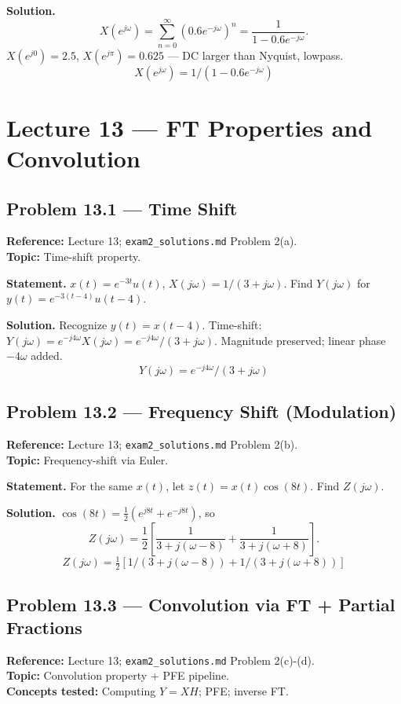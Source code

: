\documentclass[11pt]{article}
\begin{document}
\textbf{Solution.}
\[
X(e^{j\omega}) = \sum_{n=0}^\infty (0.6 e^{-j\omega})^n = \frac{1}{1 - 0.6 e^{-j\omega}}.
\]
$X(e^{j0}) = 2.5$, $X(e^{j\pi}) = 0.625$ --- DC larger than Nyquist, lowpass.
\[
\boxed{\,X(e^{j\omega}) = 1/(1-0.6 e^{-j\omega})\,}
\]

\section{Lecture 13 --- FT Properties and Convolution}

\subsection{Problem 13.1 --- Time Shift}
\textbf{Reference:} Lecture 13; \texttt{exam2\_solutions.md} Problem 2(a).\\
\textbf{Topic:} Time-shift property.

\textbf{Statement.} $x(t) = e^{-3t}u(t)$, $X(j\omega) = 1/(3+j\omega)$. Find $Y(j\omega)$ for $y(t) = e^{-3(t-4)}u(t-4)$.

\textbf{Solution.}
Recognize $y(t) = x(t-4)$. Time-shift: $Y(j\omega) = e^{-j4\omega}X(j\omega) = e^{-j4\omega}/(3+j\omega)$. Magnitude preserved; linear phase $-4\omega$ added.
\[
\boxed{\,Y(j\omega) = e^{-j4\omega}/(3+j\omega)\,}
\]

\subsection{Problem 13.2 --- Frequency Shift (Modulation)}
\textbf{Reference:} Lecture 13; \texttt{exam2\_solutions.md} Problem 2(b).\\
\textbf{Topic:} Frequency-shift via Euler.

\textbf{Statement.} For the same $x(t)$, let $z(t) = x(t)\cos(8t)$. Find $Z(j\omega)$.

\textbf{Solution.}
$\cos(8t) = \tfrac{1}{2}(e^{j8t}+e^{-j8t})$, so
\[
Z(j\omega) = \frac{1}{2}\left[\frac{1}{3+j(\omega-8)} + \frac{1}{3+j(\omega+8)}\right].
\]
\[
\boxed{\,Z(j\omega) = \tfrac{1}{2}[1/(3+j(\omega-8)) + 1/(3+j(\omega+8))]\,}
\]

\subsection{Problem 13.3 --- Convolution via FT + Partial Fractions}
\textbf{Reference:} Lecture 13; \texttt{exam2\_solutions.md} Problem 2(c)-(d).\\
\textbf{Topic:} Convolution property + PFE pipeline.\\
\textbf{Concepts tested:} Computing $Y = XH$; PFE; inverse FT.
\end{document}

